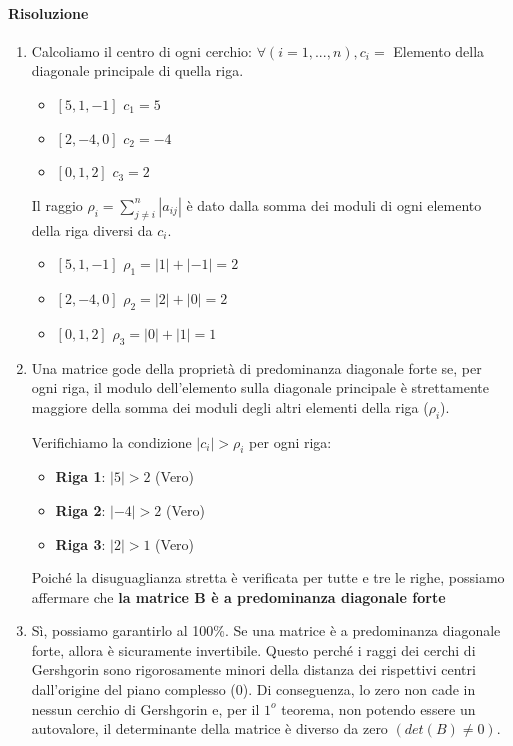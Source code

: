 \documentclass[a4paper,12pt]{article}
\begin{document}
		\paragraph{Risoluzione}
		
		\begin{enumerate}
			\item Calcoliamo il centro di ogni cerchio: $\forall(i=1,...,n), c_i =$ Elemento della diagonale principale di quella riga.
			\begin{itemize}
				\item $[5, 1, -1]$ $c_1 = 5$
				\item $[2, -4, 0]$ $c_2 = -4$
				\item $[0, 1, 2]$ $c_3 = 2$
			\end{itemize}
			Il raggio $\rho_i = \sum_{j\neq i}^{n} |a_{ij}|$ è dato dalla somma dei moduli di ogni elemento della riga diversi da $c_i$.
			\begin{itemize}
				\item $[5, 1, -1]$ $\rho_1 = |1| + |-1| = 2$
				\item $[2, -4, 0]$ $\rho_2 = |2| + |0| = 2$
				\item $[0, 1, 2]$ $\rho_3 = |0| + |1| = 1$
			\end{itemize} 
			\item Una matrice gode della proprietà di predominanza diagonale forte se, per ogni riga, il modulo dell'elemento sulla diagonale principale è strettamente maggiore della somma dei moduli degli altri elementi della riga ($\rho_i$).
			
			Verifichiamo la condizione $|c_i| > \rho_i$ per ogni riga:
			\begin{itemize}
				\item \textbf{Riga 1}: $|5| > 2$ (Vero)
				\item \textbf{Riga 2}: $|-4| > 2$ (Vero)
				\item \textbf{Riga 3}: $|2| > 1$ (Vero)
			\end{itemize}
			Poiché la disuguaglianza stretta è verificata per tutte e tre le righe, possiamo affermare che \textbf{la matrice B è a predominanza diagonale forte}
			\item Sì, possiamo garantirlo al 100\%. Se una matrice è a predominanza diagonale forte, allora è sicuramente invertibile. Questo perché i raggi dei cerchi di Gershgorin sono rigorosamente minori della distanza dei rispettivi centri dall'origine del piano complesso (0). Di conseguenza, lo zero non cade in nessun cerchio di Gershgorin e, per il $1^o$ teorema, non potendo essere un autovalore, il determinante della matrice è diverso da zero $(det(B)\neq0)$.
		\end{enumerate}
		
	
\end{document}
